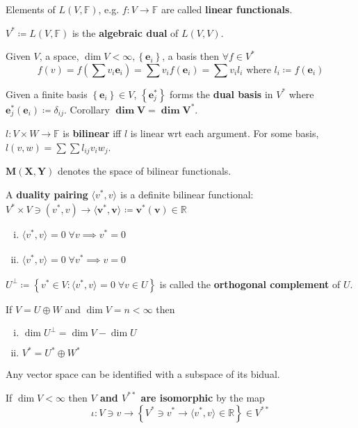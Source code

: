 \documentclass[letterpaper,11pt]{amsart}
\newcommand{\dualpair}[3][]{{\langle{}{#2},{#3}\rangle{}}_{#1}\xspace{}}
\newcommand{\reals}{\mathbb{R}}
\newcommand{\keyphrase}[1]{\textbf{#1}}
\begin{document}
Elements of $L(V,\mathbb{F})$, e.g. $f:V\to{}\mathbb{F}$
are called \keyphrase{linear functionals}.

$V^{*} \coloneqq L(V,\mathbb{F})$ is the \keyphrase{algebraic dual} of $L(V,V)$.

Given $V$, a space, $\dim V < \infty,
\left\{ \mathbf{e}_{i} \right\}$, a basis then $\forall f \in V^{*}$
\[
f(v)
= f\left( \sum v_{i} \mathbf{e}_{i} \right)
= \sum v_{i} f\left( \mathbf{e}_{i} \right)
= \sum v_{i} l_{i}
\textrm{ where } l_{i} \coloneqq f\left( \mathbf{e}_{i} \right)
\]

Given a finite basis $\left\{ \mathbf{e}_{i} \right\} \in V$,
$\left\{ \mathbf{e}_{j}^{*} \right\}$ forms
the \keyphrase{dual basis} in $V^{*}$
where $\mathbf{e}_{j}^{*}\left( \mathbf{e}_{i} \right)\coloneqq{}\delta_{ij}$.
Corollary $\boldsymbol{\dim V = \dim V^{*}}$.

$l:V\times{}W\to{}\mathbb{F}$ is \keyphrase{bilinear} iff $l$ is linear
wrt each argument.  For some basis, $l(v,w) = \sum \sum l_{ij} v_{i} w_{j}$.

$\boldsymbol{M(X,Y)}$ denotes the space of bilinear functionals.

A \keyphrase{duality pairing} $\dualpair{v^{*}}{v}$
is a definite bilinear functional:
$V^{*}\times{}V \ni (v^{*},v)
\to{}
\boldsymbol{\dualpair{v^{*}}{v} \coloneqq v^{*}(v)} \in \reals{}$
\begin{enumerate}[(i)]
    \item $\dualpair{v^{*}}{v} = 0 \; \forall v \implies v^{*} = 0$
    \item $\dualpair{v^{*}}{v} = 0 \; \forall v^{*} \implies v = 0$
\end{enumerate}

$U^{\bot}\coloneqq{}
\left\{v^{*}\in{}V:\dualpair{v^{*}}{v}=0 \; \forall{}v\in{}U\right\}$
is called the \keyphrase{orthogonal complement} of $U$.

If $V=U\oplus{}W$ and $\dim{}V=n<\infty$ then
\begin{enumerate}[(i)]
    \item $\dim U^{\bot} = \dim V - \dim U$
    \item $V^{*}=U^{*}\oplus{}W^{*}$
\end{enumerate}

Any vector space can be identified with a subspace of its bidual.

If $\dim V < \infty$ then \keyphrase{$V$ and $V^{**}$ are isomorphic} by the map
\[
    \iota:V\ni{}v \to \left\{
    V^{*}\ni{}v^{*} \to \dualpair{v^{*}}{v} \in \reals{}
    \right\} \in V^{**}
\]
\end{document}
